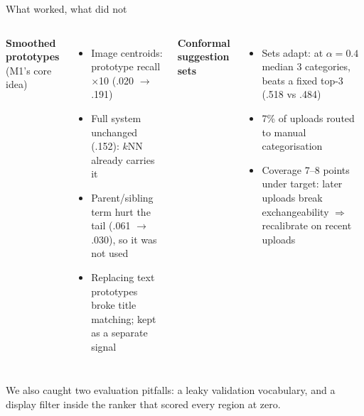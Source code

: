 \documentclass[aspectratio=169,11pt]{beamer}
\begin{document}
\begin{frame}{What worked, what did not}
\begin{columns}[T]
\textbf{Smoothed prototypes} {\small(M1's core idea)}
\begin{itemize}\small\setlength{\itemsep}{3pt}
\item {\color{good}Image centroids}: prototype recall$\times$10 (.020 $\rightarrow$ .191)
\item {\color{muted}Full system unchanged} (.152): $k$NN already carries it
\item {\color{bad}Parent/sibling term hurt the tail} (.061 $\rightarrow$ .030), so it was not used
\item {\color{bad}Replacing text prototypes} broke title matching; kept as a separate signal
\end{itemize}
\textbf{Conformal suggestion sets}
\begin{itemize}\small\setlength{\itemsep}{3pt}
\item Sets adapt: at $\alpha{=}0.4$ median 3 categories, beats a fixed top-3 (.518 vs .484)
\item 7\% of uploads routed to manual categorisation
\item {\color{bad}Coverage 7--8 points under target}: later uploads break exchangeability $\Rightarrow$ recalibrate on recent uploads
\end{itemize}
\end{columns}
\vspace{10pt}
\small\color{muted} We also caught two evaluation pitfalls: a leaky validation vocabulary, and a display filter inside the ranker that scored every region at zero.
\end{frame}
\end{document}
